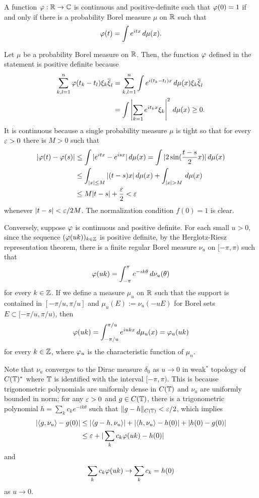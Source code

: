 \documentclass[12pt]{article}
\begin{document}
\begin{cor}
A function $\varphi:\mathbb{R}\to\mathbb{C}$ is continuous and positive-definite such that $\varphi(0)=1$ if and only if there is a probability Borel measure $\mu$ on $\mathbb{R}$ such that
\[\varphi(t)=\int e^{itx}\,d\mu(x).\]
\end{cor}
\begin{pf}
Let $\mu$ be a probability Borel measure on $\mathbb{R}$.
Then, the function $\varphi$ defined in the statement is positive definite because
\begin{align*}
\sum_{k,l=1}^n\varphi(t_k-t_l)\xi_k\overline\xi_l
&=\sum_{k,l=1}^n\int e^{i(t_k-t_l)x}\,d\mu(x)\xi_k\overline\xi_l\\
&=\int\left|\sum_{k=1}e^{it_kx}\xi_k\right|^2\,d\mu(x)\ge0.
\end{align*}
It is continuous because a single probability measure $\mu$ is tight so that for every $\varepsilon>0$ there is $M>0$ such that
\begin{align*}
|\f(t)-\f(s)|&\le\int|e^{itx}-e^{isx}|\,d\mu(x)
=\int|2\sin(\frac{t-s}2x)|\,d\mu(x)\\
&\le\int_{|x|\le M}|(t-s)x|\,d\mu(x)+\int_{|x|>M}\,d\mu(x)\\
&\le M|t-s|+\frac\e2<\e
\end{align*}
whenever $|t-s|<\varepsilon/2M$.
The normalization condition $f(0)=1$ is clear.

Conversely, suppose $\varphi$ is continuous and positive definite.
For each small $u>0$, since the sequence $(\varphi(uk))_{k\in\mathbb{Z}}$ is positive definite, by the Herglotz-Riesz representation theorem, there is a finite regular Borel measure $\nu_u$ on $[-\pi,\pi)$ such that
\[\varphi(uk)=\int_{-\pi}^\pi e^{-ik\theta}\,d\nu_u(\theta)\]
for every $k\in\mathbb{Z}$.
If we define a measure $\mu_u$ on $\mathbb{R}$ such that the support is contained in $[-\pi/u,\pi/u]$ and $\mu_u(E):=\nu_u(-uE)$ for Borel sets $E\subset[-\pi/u,\pi/u)$, then
\[\varphi(uk)=\int_{-\pi/u}^{\pi/u}e^{iukx}\,d\mu_u(x)=\varphi_u(uk)\]
for every $k\in\mathbb{Z}$, where $\varphi_u$ is the characteristic function of $\mu_n$.

Note that $\nu_u$ converges to the Dirac measure $\delta_0$ as $u\to0$ in weak$^*$ topology of $C(\mathbb{T})^*$ where $\mathbb{T}$ is identified with the interval $[-\pi,\pi)$.
This is because trigonometric polynomials are uniformly dense in $C(\mathbb{T})$ and $\nu_u$ are uniformly bounded in norm; for any $\varepsilon>0$ and $g\in C(\mathbb{T})$, there is a trigonometric polynomial $h=\sum_kc_ke^{-ik\theta}$ such that $\|g-h\|_{C(\mathbb{T})}<\varepsilon/2$, which implies
\begin{align*}
|\langle g,\nu_u\rangle-g(0)|
&\le|\langle g-h,\nu_u\rangle|+|\langle h,\nu_u\rangle-h(0)|+|h(0)-g(0)|\\
&\le\varepsilon+|\sum_kc_k\varphi(uk)-h(0)|
\end{align*}
and
\[\sum_kc_k\varphi(uk)\to\sum_kc_k=h(0)\]
as $u\to0$.


\end{pf}
\end{document}
